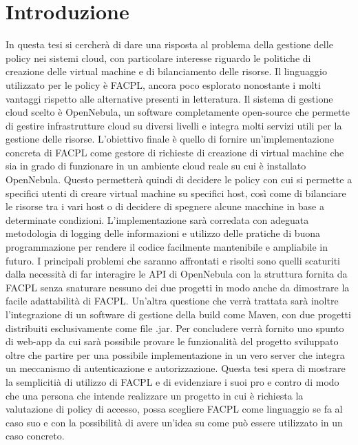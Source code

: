 
\chapter{Introduzione}
In questa tesi si cercherà di dare una risposta al problema della gestione delle policy nei sistemi cloud, con particolare interesse riguardo le politiche di creazione delle virtual machine e di bilanciamento delle risorse. Il linguaggio utilizzato per le policy è FACPL, ancora poco esplorato nonostante i molti vantaggi rispetto alle alternative presenti in letteratura.\medbreak
Il sistema di gestione cloud scelto è OpenNebula, un software completamente open-source che permette di gestire infrastrutture cloud su diversi livelli e integra molti servizi utili per la gestione delle risorse.\medbreak
L'obiettivo finale è quello di fornire un'implementazione concreta di FACPL come gestore di richieste di creazione di virtual machine che sia in grado di funzionare in un ambiente cloud reale su cui è installato OpenNebula. Questo permetterà quindi di decidere le policy con cui si permette a specifici utenti di creare virtual machine su specifici host, così come di bilanciare le risorse tra i vari host o di decidere di spegnere alcune macchine in base a determinate condizioni.\medbreak
L'implementazione sarà corredata con adeguata metodologia di logging delle informazioni e utilizzo delle pratiche di buona programmazione per rendere il codice facilmente mantenibile e ampliabile in futuro.\medbreak
I principali problemi che saranno affrontati e risolti sono quelli scaturiti dalla necessità di far interagire le API di OpenNebula con la struttura fornita da FACPL senza snaturare nessuno dei due progetti in modo anche da dimostrare la facile adattabilità di FACPL. Un'altra questione che verrà trattata sarà inoltre l'integrazione di un software di gestione della build come Maven, con due progetti distribuiti esclusivamente come file .jar.\medbreak
Per concludere verrà fornito uno spunto di web-app da cui sarà possibile provare le funzionalità del progetto sviluppato oltre che partire per una possibile implementazione in un vero server che integra un meccanismo di autenticazione e autorizzazione.\medbreak
Questa tesi spera di mostrare la semplicitià di utilizzo di FACPL e di evidenziare i suoi pro e contro di modo che una persona che intende realizzare un progetto in cui è richiesta la valutazione di policy di accesso, possa scegliere FACPL come linguaggio se fa al caso suo e con la possibilità di avere un'idea su come può essere utilizzato in un caso concreto.\medbreak
